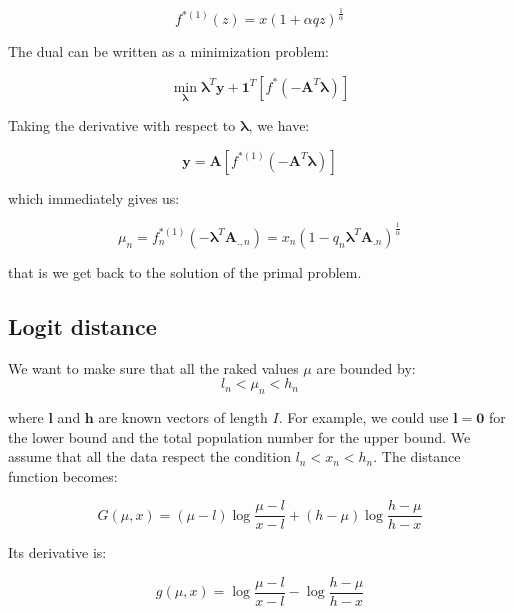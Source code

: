\documentclass{tex/note}
\begin{document}
\begin{equation*}
f^{* \left( 1 \right)} \left( z \right) = x \left( 1 + \alpha q z \right)^{\frac{1}{\alpha}}
\end{equation*}

The dual can be written as a minimization problem:

\begin{equation*}
\min_{\bm{\lambda}} \bm{\lambda}^T \bm{y} + \bm{1}^T \left[ f^* \left( - \bm{A}^T \bm{\lambda} \right) \right] 
\end{equation*}

Taking the derivative with respect to $\bm{\lambda}$, we have:

\begin{equation*}
\bm{y} = \bm{A} \left[ f^{* \left( 1 \right)} \left( - \bm{A}^T \bm{\lambda} \right) \right]
\end{equation*}

which immediately gives us:

\begin{equation*}
\mu_n = f_n^{* \left( 1 \right)} \left( - \bm{\lambda}^T \bm{A}_{.,n} \right) = x_n \left( 1 - q_n \bm{\lambda}^T \bm{A}_{.n} \right)^{\frac{1}{\alpha}}
\end{equation*}

that is we get back to the solution of the primal problem.

\subsection{Logit distance}

We want to make sure that all the raked values $\mu$ are bounded by:
\begin{equation*}
l_n < \mu_n < h_n
\end{equation*}

where $\bm{l}$ and $\bm{h}$ are known vectors of length $I$. For example, we could use $\bm{l} = \bm{0}$ for the lower bound and the total population number for the upper bound. We assume that all the data respect the condition $l_n < x_n < h_n$. The distance function becomes:

\begin{equation*}
G \left( \mu , x \right) = \left( \mu - l  \right) \log \frac{\mu - l}{x - l} + \left( h - \mu \right) \log \frac{h - \mu}{h - x}
\end{equation*}

Its derivative is:

\begin{equation*}
g \left( \mu , x \right) = \log \frac{\mu - l}{x - l} - \log \frac{h - \mu}{h - x}
\end{equation*}
\end{document}
